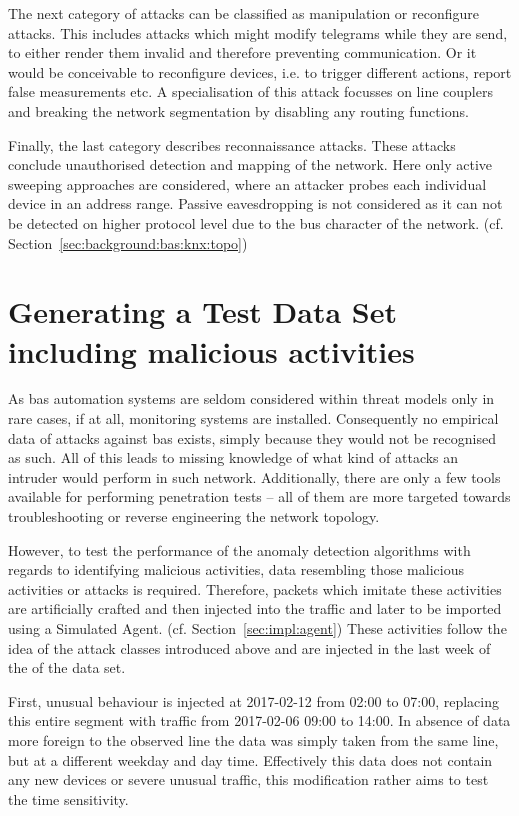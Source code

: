 The next category of attacks can be classified as manipulation or reconfigure attacks. This includes attacks which might modify telegrams while they are send, to either render them invalid and therefore preventing communication. Or it would be conceivable to reconfigure devices, i.e. to trigger different actions, report false measurements etc. A specialisation of this attack focusses on line couplers and breaking the network segmentation by disabling any routing functions.

Finally, the last category describes reconnaissance attacks. These attacks conclude unauthorised detection and mapping of the network. Here only active sweeping approaches are considered, where an attacker probes each individual device in an address range.
Passive eavesdropping is not considered as it can not be detected on higher protocol level due to the bus character of the network. (cf. Section~\ref{sec:background:bas:knx:topo})

\section{Generating a Test Data Set including malicious activities}
\label{sec:methods:gen-test}

As \gls{bas} automation systems are seldom considered within threat models only in rare cases, if at all, monitoring systems are installed.
Consequently no empirical data of attacks against \gls{bas} exists, simply because they would not be recognised as such.
All of this leads to missing knowledge of what kind of attacks an intruder would perform in such network.
Additionally, there are only a few tools available for performing penetration tests -- all of them are more targeted towards troubleshooting or reverse engineering the network topology.

However, to test the performance of the anomaly detection algorithms with regards to identifying malicious activities, data resembling those malicious activities or attacks is required.
Therefore, packets which imitate these activities are artificially crafted and then injected into the traffic and later to be imported using a Simulated Agent. (cf. Section~\ref{sec:impl:agent})
These activities follow the idea of the attack classes introduced above and are injected in the last week of the of the data set.

First, unusual behaviour is injected at 2017-02-12 from 02:00 to 07:00, replacing this entire segment with traffic from 2017-02-06 09:00 to 14:00. In absence of data more foreign to the observed line the data was simply taken from the same line, but at a different weekday and day time. Effectively this data does not contain any new devices or severe unusual traffic, this modification rather aims to test the time sensitivity.

